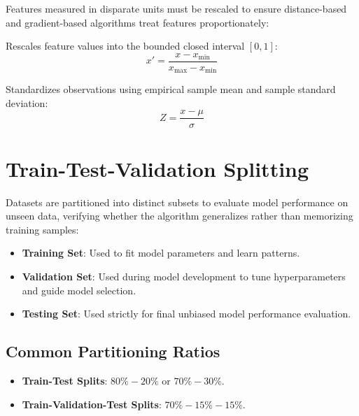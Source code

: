 Features measured in disparate units must be rescaled to ensure distance-based and gradient-based algorithms treat features proportionately:

\begin{formulabox}
Rescales feature values into the bounded closed interval $[0, 1]$:
\begin{equation}
x' = \frac{x - x_{\min}}{x_{\max} - x_{\min}}
\end{equation}
\end{formulabox}

\begin{formulabox}
Standardizes observations using empirical sample mean and sample standard deviation:
\begin{equation}
Z = \frac{x - \mu}{\sigma}
\end{equation}
\end{formulabox}

\section{Train-Test-Validation Splitting}

Datasets are partitioned into distinct subsets to evaluate model performance on unseen data, verifying whether the algorithm generalizes rather than memorizing training samples:

\begin{itemize}[leftmargin=1.5em]
    \item \textbf{Training Set}: Used to fit model parameters and learn patterns.
    \item \textbf{Validation Set}: Used during model development to tune hyperparameters and guide model selection.
    \item \textbf{Testing Set}: Used strictly for final unbiased model performance evaluation.
\end{itemize}

\subsection{Common Partitioning Ratios}
\begin{itemize}[leftmargin=1.5em]
    \item \textbf{Train-Test Splits}: $80\% - 20\%$ or $70\% - 30\%$.
    \item \textbf{Train-Validation-Test Splits}: $70\% - 15\% - 15\%$.
\end{itemize}

